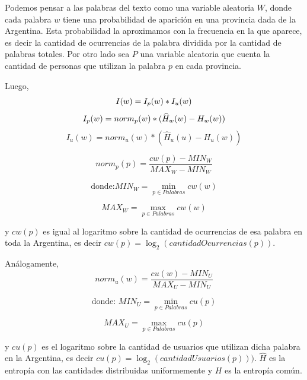 Podemos pensar a las palabras del texto como una variable aleatoria $W$, donde cada palabra $w$ tiene una probabilidad de aparición en una provincia dada de la Argentina. Esta probabilidad la aproximamos con la frecuencia en la que aparece, es decir la cantidad de ocurrencias de la palabra dividida por la cantidad de palabras totales.
Por otro lado sea $P$ una variable aleatoria que cuenta la cantidad de personas que 
utilizan la palabra $p$ en cada provincia.

Luego,
\begin{equation}
I(w) =  I_p(w) * I_u(w)\\
\end{equation}
\begin{equation}
I_p(w) = norm_{p}(w) * (\widehat{H}_{w}(w) - H_{w}(w)) \\
\end{equation}
\begin{equation}
I_u(w) = norm_{u}(w) * (\widehat{H}_{u}(u) - H_{u}(w))
\end{equation}

\begin{equation}
norm_{p}(p) = \frac{cw(p)- MIN_W }{MAX_W - MIN_W}
\label{eq:norm1}
\end{equation}

\noindent\begin{minipage}{.5\linewidth}
\begin{equation}
\text{donde:}  MIN_W = \min\limits_{p \in Palabras} cw(w)
\end{equation}
\end{minipage}%
\begin{minipage}{.5\linewidth}
\begin{equation}
  MAX_W = \max\limits_{p \in Palabras} cw(w)
\end{equation}
\end{minipage}
y $cw(p)$ es igual al logaritmo sobre la cantidad de ocurrencias de esa palabra en toda la Argentina, es decir $cw(p) = \log_2(cantidadOcurrencias(p))$.

Análogamente,
\begin{equation}
norm_{u}(w) = \frac{cu(w)- MIN_U }{MAX_U - MIN_U}
\label{eq:norm2}
\end{equation}
\noindent\begin{minipage}{.5\linewidth}
\begin{equation}
 \text{donde: } MIN_U = \min\limits_{p \in Palabras} cu(p)
\end{equation}
\end{minipage}%
\begin{minipage}{.5\linewidth}
\begin{equation}
  MAX_U = \max\limits_{p \in Palabras} cu(p)
\end{equation}
\end{minipage}
y $cu(p)$ es el logaritmo sobre  la cantidad de usuarios que utilizan dicha palabra en la Argentina, es decir $cu(p)= \log_2(cantidadUsuarios(p)))$.
$\widehat{H}$ es la entropía con las cantidades distribuidas uniformemente y $H$ es la entropía común.


